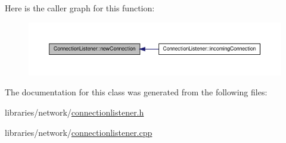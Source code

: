 Here is the caller graph for this function:\nopagebreak
\begin{figure}[H]
\begin{center}
\leavevmode
\includegraphics[width=400pt]{class_connection_listener_a75364f505d306f8c78903d0a7ab8b389_icgraph}
\end{center}
\end{figure}




The documentation for this class was generated from the following files:\begin{DoxyCompactItemize}
\item 
libraries/network/\hyperlink{connectionlistener_8h}{connectionlistener.h}\item 
libraries/network/\hyperlink{connectionlistener_8cpp}{connectionlistener.cpp}\end{DoxyCompactItemize}
